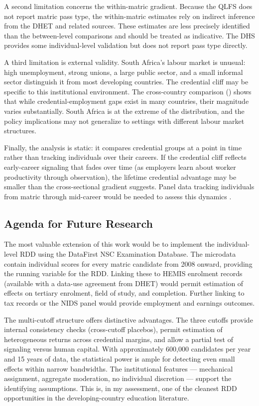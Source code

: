 \documentclass[12pt]{article}
\begin{document}
A second limitation concerns the within-matric gradient. Because the QLFS does not report matric pass type, the within-matric estimates rely on indirect inference from the DHET and related sources. These estimates are less precisely identified than the between-level comparisons and should be treated as indicative. The DHS provides some individual-level validation but does not report pass type directly.

A third limitation is external validity. South Africa's labour market is unusual: high unemployment, strong unions, a large public sector, and a small informal sector distinguish it from most developing countries. The credential cliff may be specific to this institutional environment. The cross-country comparison () shows that while credential-employment gaps exist in many countries, their magnitude varies substantially. South Africa is at the extreme of the distribution, and the policy implications may not generalize to settings with different labour market structures.

Finally, the analysis is static: it compares credential groups at a point in time rather than tracking individuals over their careers. If the credential cliff reflects early-career signaling that fades over time (as employers learn about worker productivity through observation), the lifetime credential advantage may be smaller than the cross-sectional gradient suggests. Panel data tracking individuals from matric through mid-career would be needed to assess this dynamics \citep{dale2002estimating}.

\subsection{Agenda for Future Research}

The most valuable extension of this work would be to implement the individual-level RDD using the DataFirst NSC Examination Database. The microdata contain individual scores for every matric candidate from 2008 onward, providing the running variable for the RDD. Linking these to HEMIS enrolment records (available with a data-use agreement from DHET) would permit estimation of effects on tertiary enrolment, field of study, and completion. Further linking to tax records or the NIDS panel would provide employment and earnings outcomes.

The multi-cutoff structure offers distinctive advantages. The three cutoffs provide internal consistency checks (cross-cutoff placebos), permit estimation of heterogeneous returns across credential margins, and allow a partial test of signaling versus human capital. With approximately 600{,}000 candidates per year and 15 years of data, the statistical power is ample for detecting even small effects within narrow bandwidths. The institutional features --- mechanical assignment, aggregate moderation, no individual discretion --- support the identifying assumptions. This is, in my assessment, one of the cleanest RDD opportunities in the developing-country education literature.
\end{document}

